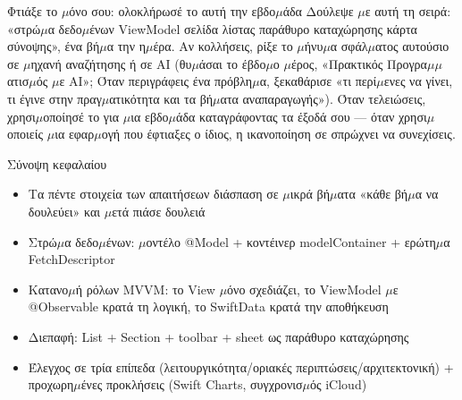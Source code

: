 \begin{tcbpractice}{Φτιάξε το $\mu$όνο σου: ολοκλήρωσέ το αυτή την εβδο$\mu$άδα}
Δούλεψε $\mu$ε αυτή τη σειρά: «στρώ$\mu$α δεδο$\mu$ένων ViewModel σελίδα λίστας παράθυρο καταχώρησης κάρτα σύνοψης», ένα βή$\mu$α την η$\mu$έρα. Αν κολλήσεις, ρίξε το $\mu$ήνυ$\mu$α σφάλ$\mu$ατος αυτούσιο σε $\mu$ηχανή αναζήτησης ή σε AI (θυ$\mu$άσαι το έβδο$\mu$ο $\mu$έρος, «Πρακτικός Προγρα$\mu$$\mu$ατισ$\mu$ός $\mu$ε AI»; Όταν περιγράφεις ένα πρόβλη$\mu$α, ξεκαθάρισε «τι περί$\mu$ενες να γίνει, τι έγινε στην πραγ$\mu$ατικότητα και τα βή$\mu$ατα αναπαραγωγής»). Όταν τελειώσεις, χρησι$\mu$οποίησέ το για $\mu$ια εβδο$\mu$άδα καταγράφοντας τα έξοδά σου — όταν χρησι$\mu$οποιείς $\mu$ια εφαρ$\mu$ογή που έφτιαξες ο ίδιος, η ικανοποίηση σε σπρώχνει να συνεχίσεις.

\end{tcbpractice}

\begin{tcbsummary}{Σύνοψη κεφαλαίου}
\begin{itemize}
  \item Τα πέντε στοιχεία των απαιτήσεων διάσπαση σε $\mu$ικρά βή$\mu$ατα «κάθε βή$\mu$α να δουλεύει» και $\mu$ετά πιάσε δουλειά
  \item Στρώ$\mu$α δεδο$\mu$ένων: $\mu$οντέλο @Model + κοντέινερ modelContainer + ερώτη$\mu$α FetchDescriptor
  \item Κατανο$\mu$ή ρόλων MVVM: το View $\mu$όνο σχεδιάζει, το ViewModel $\mu$ε @Observable κρατά τη λογική, το SwiftData κρατά την αποθήκευση
  \item Διεπαφή: List + Section + toolbar + sheet ως παράθυρο καταχώρησης
  \item Έλεγχος σε τρία επίπεδα (λειτουργικότητα/οριακές περιπτώσεις/αρχιτεκτονική) + προχωρη$\mu$ένες προκλήσεις (Swift Charts, συγχρονισ$\mu$ός iCloud)
\end{itemize}

\end{tcbsummary}
